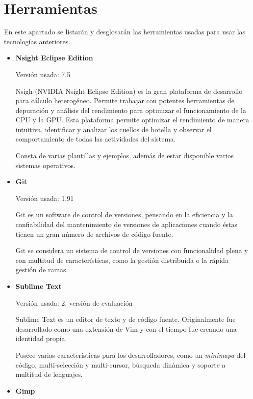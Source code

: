 	
	

\newpage
\section{Herramientas}

En este apartado se listarán y desglosarán las herramientas usadas para usar las tecnologías anteriores.


\begin{itemize}
	\item \textbf{Nsight Eclipse Edition}
	
	Versión usada: 7.5
		
	Nsigh (NVIDIA Nsight Eclipse Edition) \cite{nsight} es la gran plataforma de desarrollo para cálculo heterogéneo. Permite trabajar con potentes herramientas de depuración y análisis del rendimiento para optimizar el funcionamiento de la CPU y la GPU. Esta plataforma permite optimizar el rendimiento de manera intuitiva, identificar y analizar los cuellos de botella y observar el comportamiento de todas las actividades del sistema.

	Consta de varias plantillas y ejemplos, además de estar disponible varios sistemas operativos.
 
 
	\bigskip			
	\item \textbf{Git}
			
		Versión usada: 1.91
		
	Git \cite{git} es un software de control de versiones, pensando en la eficiencia y la confiabilidad del mantenimiento de versiones de aplicaciones cuando éstas tienen un gran número de archivos de código fuente. 

	Git se considera un sistema de control de versiones con funcionalidad plena y con multitud de características, como la gestión distribuida o la rápida gestión de ramas. 


	\bigskip			
	\item \textbf{Sublime Text}
			
	Versión usada: 2, versión de evaluación
		
	Sublime Text \cite{sublimetext} es un editor de texto y de código fuente. Originalmente fue desarrollado como una extensión de Vim y con el tiempo fue creando una identidad propia.

	Poseee varias características para los desarrolladores, como un \textit{minimapa} del código, multi-selección y multi-cursor, búsqueda dinámica y soporte a multitud de lenguajes.


	\bigskip			
	\item \textbf{Gimp}
			

\end{itemize}
